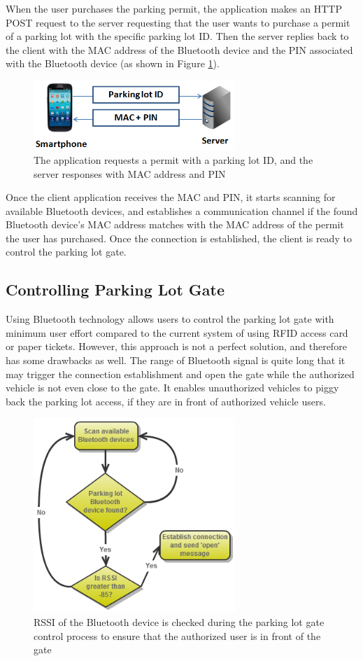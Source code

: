 When the user purchases the parking permit, the application makes an HTTP POST request to the server requesting that the user wants to purchase a permit of a parking lot with the specific parking lot ID. Then the server replies back to the client with the MAC address of the Bluetooth device and the PIN associated with the Bluetooth device (as shown in Figure \ref{fig:mac_pin}).

\begin{figure}[ht]
	\centering
		\includegraphics[width=3in]{figure/sys_detail_permit.png}
		\caption{The application requests a permit with a parking lot ID, and the server responses with MAC address and PIN}
	\label{fig:mac_pin}
\end{figure}

Once the client application receives the MAC and PIN, it starts scanning for available Bluetooth devices, and establishes a communication channel if the found Bluetooth device's MAC address matches with the MAC address of the permit the user has purchased. Once the connection is established, the client is ready to control the parking lot gate.

\subsection{Controlling Parking Lot Gate}
Using Bluetooth technology allows users to control the parking lot gate with minimum user effort compared to the current system of using RFID access card or paper tickets. However, this approach is not a perfect solution, and therefore has some drawbacks as well. The range of Bluetooth signal is quite long that it may trigger the connection establishment and open the gate while the authorized vehicle is not even close to the gate. It enables unauthorized vehicles to piggy back the parking lot access, if they are in front of authorized vehicle users. 

\begin{figure}[ht]
	\centering
		\includegraphics[width=3in]{figure/sys_detail_flow_chart.png}
		\caption{RSSI of the Bluetooth device is checked during the parking lot gate control process to ensure that the authorized user is in front of the gate}
	\label{fig:flowchart}
\end{figure}

